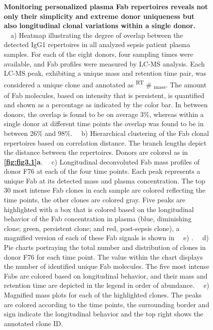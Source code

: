 \begin{figure}[!ht]
  \caption{
    \textbf{Monitoring personalized plasma Fab repertoires reveals not only their simplicity and extreme donor uniqueness but also longitudinal clonal variations within a single donor.} ~~a) Heatmap illustrating the degree of overlap between the detected IgG1 repertoires in all analyzed sepsis patient plasma samples. For each of the eight donors, four sampling times were available, and Fab profiles were measured by LC-MS analysis. Each LC-MS peak, exhibiting a unique mass and retention time pair, was considered a unique clone and annotated as \textsuperscript{RT} \# \textsubscript{mass}. The amount of Fab molecules, based on intensity that is persistent, is quantified and shown as a percentage as indicated by the color bar. In between donors, the overlap is found to be on average 3\%, whereas within a single donor at different time points the overlap was found to be in between 26\% and 98\%. ~~b) Hierarchical clustering of the Fab clonal repertoires based on correlation distance. The branch lengths depict the distance between the repertoires. Donors are colored as in \textbf{\autoref{fig:fig3.1}a}. ~~c) Longitudinal deconvoluted Fab mass profiles of donor F76 at each of the four time points. Each peak represents a unique Fab at its detected mass and plasma concentration. The top 30 most intense Fab clones in each sample are colored reflecting the time points, the other clones are colored gray. Five peaks are highlighted with a box that is colored based on the longitudinal behavior of the Fab concentration in plasma (blue, diminishing clone; green, persistent clone; and red, post-sepsis clone), a magnified version of each of these Fab signals is shown in ~~e) . ~~d) Pie charts portraying the total number and distribution of clones in donor F76 for each time point. The value within the chart displays the number of identified unique Fab molecules. The five most intense Fabs are colored based on longitudinal behavior, and their mass and retention time are depicted in the legend in order of abundance. ~~e) Magnified mass plots for each of the highlighted clones. The peaks are colored according to the time points, the surrounding border and sign indicate the longitudinal behavior and the top right shows the annotated clone ID.
  }
\end{figure}

